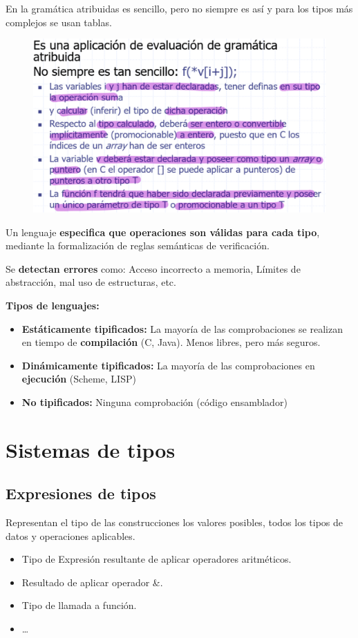 \documentclass[12pt]{report} %
\begin{document}
En la gramática atribuidas es sencillo, pero no siempre es así y para los tipos más complejos se usan tablas.
\begin{figure}[H]
  {\includegraphics[scale=.25]{2021-05-01 02_14_46-06_resum_Tipos_2021.pdf - Foxit Reader.png}}
\end{figure}

Un lenguaje \textbf{especifica que operaciones son válidas para cada tipo}, mediante la formalización de reglas semánticas de verificación.

Se \textbf{detectan errores} como: Acceso incorrecto a memoria, Límites de abstracción, mal uso de estructuras, etc.

\textbf{Tipos de lenguajes:}
\begin{itemize}
  \item \textbf{Estáticamente tipificados:} La mayoría de las comprobaciones se realizan en tiempo de \textbf{compilación} (C, Java). Menos libres, pero más seguros.
  \item \textbf{Dinámicamente tipificados:} La mayoría de las comprobaciones en \textbf{ejecución} (Scheme, LISP)
  \item \textbf{No tipificados:} Ninguna comprobación (código ensamblador)
\end{itemize}

\section{Sistemas de tipos}
\subsection{Expresiones de tipos}
Representan el tipo de las construcciones los valores posibles, todos los tipos de datos y operaciones aplicables.
\begin{itemize}
  \item Tipo de Expresión resultante de aplicar operadores aritméticos.
  \item Resultado de aplicar operador \&.
  \item Tipo de llamada a función.
  \item …
\end{itemize}
\end{document}
